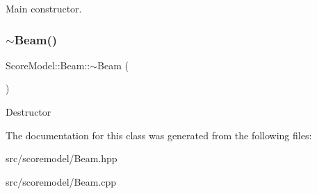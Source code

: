 Main constructor. \mbox{\label{classScoreModel_1_1Beam_a72812343b337c48ac06defe9ecd1bd34}} 
\subsubsection{\texorpdfstring{$\sim$Beam()}{~Beam()}}
{\footnotesize\ttfamily Score\+Model\+::\+Beam\+::$\sim$\+Beam (\begin{DoxyParamCaption}{ }\end{DoxyParamCaption})}

Destructor 

The documentation for this class was generated from the following files\+:\begin{DoxyCompactItemize}
\item 
src/scoremodel/Beam.\+hpp\item 
src/scoremodel/Beam.\+cpp\end{DoxyCompactItemize}
